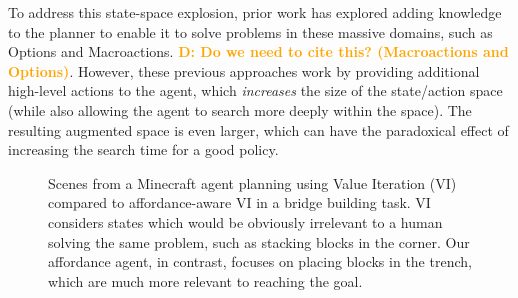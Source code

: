 \documentclass[]{article}
\newcommand{\dnote}[1]{\textcolor{Orange}{\textbf{D: #1}}}
\begin{document}
To address this state-space explosion, prior work has explored adding
knowledge to the planner to enable it to solve problems in these
massive domains, such as Options and Macroactions. \dnote{Do we need to cite this? (Macroactions and Options)}. However, these previous approaches work by providing additional high-level actions to the
agent, which {\em increases} the size of the state/action space (while
also allowing the agent to search more deeply within the space).  The
resulting augmented space is even larger, which can have the
paradoxical effect of increasing the search time for a good policy.

\begin{figure}
\centering
%
%
  \caption{Scenes from a Minecraft agent planning using Value
    Iteration (VI) compared to affordance-aware VI in a bridge
    building task.  VI considers states which would be obviously
    irrelevant to a human solving the same problem, such as stacking
    blocks in the corner.  Our affordance agent, in contrast, focuses
    on placing blocks in the trench, which are much more relevant to
    reaching the goal.\label{fig:minecraft}}
\end{figure}
\end{document}
